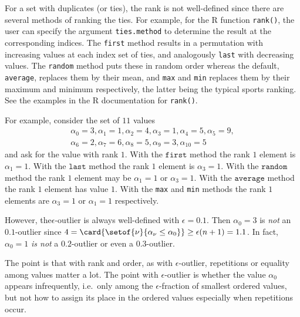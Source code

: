 \documentclass[12pt]{article}
\begin{document}
\begin{example}
\begin{solution}
    For a set with duplicates (or ties), the rank is not well-defined
    since there are several methods of ranking the ties.  For example,
    for the R function \texttt{rank()}, the user can specify the
    argument \texttt{ties.method} to determine the result at the
    corresponding indices.  The \texttt{first} method results in a
    permutation with increasing values at each index set of ties, and
    analogously \texttt{last} with decreasing values.  The \texttt{random}
    method puts these in random order whereas the default, \texttt{average},
    replaces them by their mean, and \texttt{max} and \texttt{min}
    replaces them by their maximum and minimum respectively, the latter
    being the typical sports ranking.  See the examples in the R
    documentation for \texttt{rank()}.

    For example, consider the set of \( 11 \) values
    \begin{multline*}
        \alpha_0 = 3, \alpha_1 = 1, \alpha_2 = 4, \alpha_3 = 1,
        \alpha_4 = 5, \alpha_5 = 9, \\
        \alpha_6 = 2, \alpha_7 = 6, \alpha_8 = 5, \alpha_9 = 3, \alpha_
        {10} = 5
    \end{multline*}
    and ask for the value with rank \( 1 \).  With the \( \texttt{first}
    \) method the rank \( 1 \) element is \( \alpha_1 = 1 \).  With the \(
    \texttt{last} \) method the rank \( 1 \) element is \( \alpha_3 = 1 \).
    With the \( \texttt{random} \) method the rank \( 1 \) element may
    be \( \alpha_1 = 1 \) or \( \alpha_3 = 1 \).  With the \( \texttt{average}
    \) method the rank \( 1 \) element has value \( 1 \).  With the
    \texttt{max} and \texttt{min} methods the rank \( 1 \) elements are \(
    \alpha_3 = 1 \) or \( \alpha_1 = 1 \) respectively.

    However, the\( \epsilon \)-outlier is always well-defined with \(
    \epsilon = 0.1 \). Then \( \alpha_0 = 3 \) is \emph{not} an \( 0.1 \)-outlier
    since \( 4 = \card{%
    \setof{\nu}{\alpha_{\nu} \le \alpha_0}} \ge \epsilon(n+1) = 1.1 \).
    In fact, \( \alpha_0 = 1 \) \emph{is not} a \( 0.2 \)-outlier or
    even a \( 0.3 \)-outlier.

    The point is that with rank and order, as with
    \(\epsilon\)-outlier, repetitions or equality among values matter
    a lot.  The point with \(\epsilon\)-outlier is whether the value
    \( \alpha_0 \) appears infrequently, i.e.\ only among the
    \( \epsilon \)-fraction of smallest ordered values, but not how to
    assign its place in the ordered values especially when repetitions
    occur.
\end{solution}


\end{example}
\end{document}
